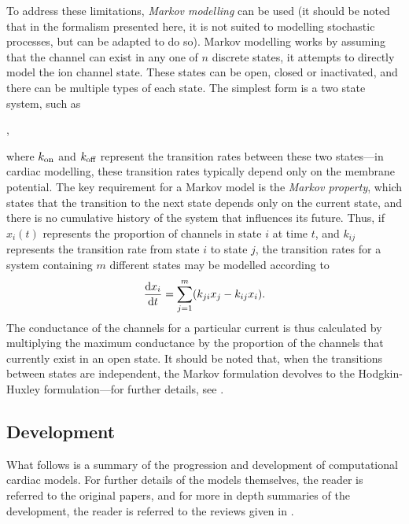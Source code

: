 \documentclass[../thesis-main.tex]{subfiles}
\begin{document}
 To address these limitations, \emph{Markov modelling} can be used (it should be noted that in the formalism presented here, it is not suited to modelling stochastic processes, but can be adapted to do so). Markov modelling works by assuming that the channel can exist in any one of $n$ discrete states, \idest{} it attempts to directly model the ion channel state. These states can be open, closed or inactivated, and there can be multiple types of each state. The simplest form is a two state system, such as
 \begin{center}
  ,
 \end{center}
 where $k_\textnormal{on}$ and $k_\textnormal{off}$ represent the transition rates between these two states---in cardiac modelling, these transition rates typically depend only on the membrane potential. The key requirement for a Markov model is the \emph{Markov property}, which states that the transition to the next state depends only on the current state, and there is no cumulative history of the system that influences its future. Thus, if $x_i(t)$ represents the proportion of channels in state $i$ at time $t$, and $k_{ij}$ represents the transition rate from state $i$ to state $j$, the transition rates for a system containing $m$ different states may be modelled according to
 \begin{equation}
  \frac{\textnormal{d}x_i}{\textnormal{d}t} = \sum_{j=1}^m (k_{ji}x_j - k_{ij}x_i).
 \end{equation}
 The conductance of the channels for a particular current is thus calculated by multiplying the maximum conductance by the proportion of the channels that currently exist in an open state. It should be noted that, when the transitions between states are independent, the Markov formulation devolves to the Hodgkin-Huxley formulation---for further details, see \citet{Rudy2006}.
 
 \subsection{Development}
 \label{subsec:model-development}
 What follows is a summary of the progression and development of computational cardiac models. For further details of the models themselves, the reader is referred to the original papers, and for more in depth summaries of the development, the reader is referred to the reviews given in \citet{Noble2001, Noble2012, Noble2011, Puglisi2004, Rudy2006, Niederer2009}.
 
\end{document}
